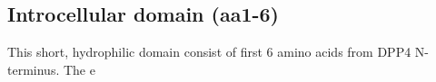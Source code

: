 \subsection{Introcellular domain (aa1-6)}

This short, hydrophilic domain consist of first 6 amino acids from DPP4 N-terminus. The e